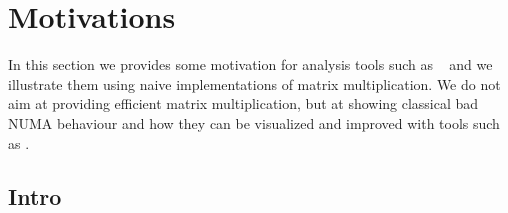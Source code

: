 
\section{Motivations}
\label{sec:motivations}

In this section we provides some motivation for analysis tools such as
\TABARNAC~ and we illustrate them using naive implementations of matrix
multiplication. We do not aim at providing efficient matrix multiplication,
but at showing classical bad NUMA behaviour and how they can be visualized and
improved with tools such as \TABARNAC.

\subsection{Intro}
\label{sec:motivations-intro}


